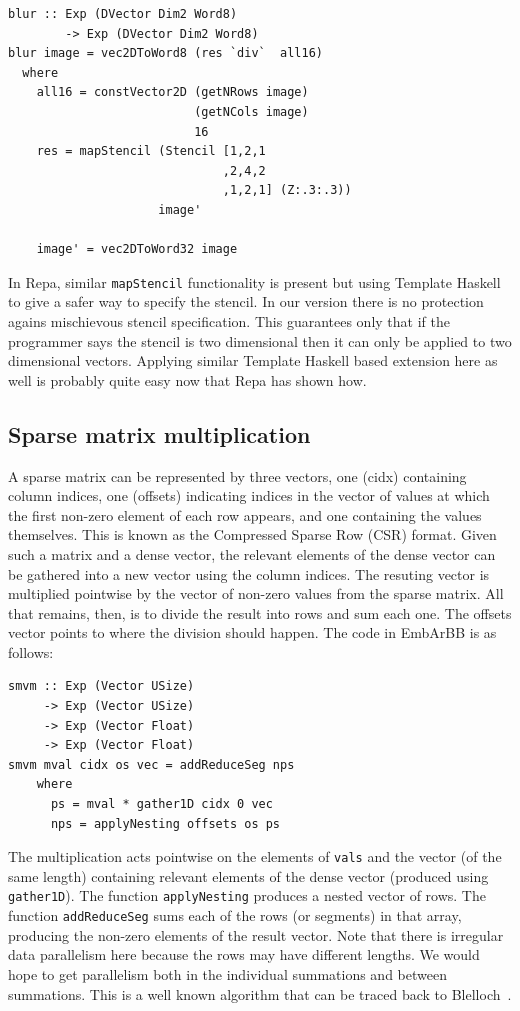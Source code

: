 \begin{verbatim} 
blur :: Exp (DVector Dim2 Word8) 
        -> Exp (DVector Dim2 Word8) 
blur image = vec2DToWord8 (res `div`  all16) 
  where 
    all16 = constVector2D (getNRows image) 
                          (getNCols image)
                          16
    res = mapStencil (Stencil [1,2,1
                              ,2,4,2   
                              ,1,2,1] (Z:.3:.3)) 
                     image' 
     
    image' = vec2DToWord32 image        
\end{verbatim}

In Repa, similar {\tt mapStencil} functionality is present but using Template 
Haskell to give a safer way to specify the stencil. In our version there is 
no protection agains mischievous stencil specification. This guarantees only
that if the programmer says the stencil is two dimensional then it can only 
be applied to two dimensional vectors. Applying similar Template Haskell based
extension here as well is probably quite easy now that Repa has shown how.

\subsection{Sparse matrix multiplication}\label{sec:smvm}
A sparse matrix can be represented by three vectors, one (cidx) containing
column indices, one (offsets) indicating indices in the vector of values
at which the first non-zero element of each row appears, and one containing the
values themselves. This is known as the Compressed Sparse Row (CSR) format.
Given such a matrix and a dense vector, the relevant elements of the dense vector
can be gathered into a new vector using the column indices. The resuting vector
is multiplied pointwise by the vector of non-zero values from the sparse matrix. All that remains, then, is to divide the result into rows and sum each one. The offsets vector
points to where the division should happen.
The code in EmbArBB is as follows:

\begin{verbatim} 
smvm :: Exp (Vector USize)
     -> Exp (Vector USize)
     -> Exp (Vector Float)
     -> Exp (Vector Float)
smvm mval cidx os vec = addReduceSeg nps 
    where 
      ps = mval * gather1D cidx 0 vec
      nps = applyNesting offsets os ps 
\end{verbatim} 

The multiplication acts pointwise on the elements of {\tt vals}
and the vector (of the same length) containing relevant elements of the dense vector (produced using {\tt gather1D}).
The function {\tt applyNesting} produces
a nested vector of rows. The function {\tt addReduceSeg} sums each
of the rows (or segments) in that array, producing the non-zero elements
of the result vector. Note that there is irregular data parallelism
here because the rows may have different lengths. We would hope
to get parallelism both in the individual summations and between summations.
This is a well known algorithm that can be traced back to Blelloch~\cite{NESL}.

